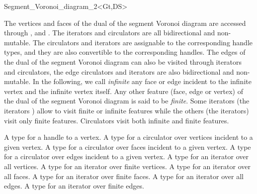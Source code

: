 \begin{ccRefClass}{Segment_Voronoi_diagram_2<Gt,DS>}

The vertices and faces of the dual of the segment Voronoi diagram are
accessed through , 
 and . 
The iterators and circulators
are all bidirectional and non-mutable.
The circulators and iterators are assignable to the 
corresponding handle types, and they are also convertible to the
corresponding handles.
The edges of the dual of the segment Voronoi diagram can also be
visited through iterators and circulators,
the edge circulators and iterators
are also bidirectional and non-mutable.
In the following, we call {\it infinite} any face or edge 
incident  to the infinite vertex and the infinite vertex itself.
Any other feature (face, edge or vertex) of the dual of the segment
Voronoi diagram is said to be {\it finite}.
Some iterators (the  iterators ) allow to visit finite or 
infinite features while the others (the  iterators) visit only
finite features. Circulators visit both infinite and finite features.

%
%
\ccGlue
{}
{A type for a handle to a vertex.}
\ccGlue
{}
\ccGlue
{}
{A type for a circulator over vertices incident to a given vertex.}
\ccGlue
{}
{A type for a circulator over faces incident to a given vertex.}
\ccGlue
{}
{A type for a circulator over edges incident to a given vertex.}
\ccGlue
{}
{A type for an iterator over all vertices.}
\ccGlue
{}
{A type for an iterator over finite vertices.}
\ccGlue
{}
{A type for an iterator over all faces.}
\ccGlue
{}
{A type for an iterator over finite faces.}
\ccGlue
{}
{A type for an iterator over all edges.}
\ccGlue
{}
{A type for an iterator over finite edges.}



\end{ccRefClass}
